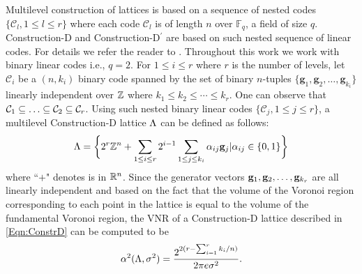 		Multilevel construction of lattices is based on a sequence of nested codes $\{\mathcal{C}_{l},1\leq l\leq r\}$ where each code $\mathcal{C}_{l}$ is of length $n$ over $\mathbb{F}_q$, a field of size $q$. Construction-D and Construction-D$^{\prime}$ are based on such nested sequence of linear codes. For details we refer the reader to \cite{conwaysphere}. Throughout this work we work with binary linear codes i.e., $q=2$. For $1\leq i \leq r$ where $r$ is the number of levels, let $\mathcal{C}_{i}$ be a $(n,k_i)$ binary code spanned by the set of binary $n$-tuples $\{\mathbf{g}_1,\mathbf{g}_2,\ldots,\mathbf{g}_{k_i}\}$ linearly independent over $\mathbb{Z}$ where $k_{1}\leq k_{2}\leq \cdots \leq k_{r}$. One can observe that $\mathcal{C}_{1}\subseteq \ldots \subseteq \mathcal{C}_{2}\subseteq \mathcal{C}_{r}$. Using such nested binary linear codes $\{\mathcal{C}_{j},1\leq j\leq r\}$, a multilevel Construction-D lattice $\Lambda$ can be defined as follows:
\begin{align}\label{Eqn:ConstrD}
 \Lambda=\biggl\{2^{r}\mathbb{Z}^{n}+\sum_{1\leq i\leq r}2^{i-1}\sum_{1\leq j\leq k_{i}}\alpha_{ij}\mathbf{g}_j|\alpha_{ij}\in\{0,1\}\biggr\}
\end{align}
where ``$+$" denotes is in $\mathbb{R}^{n}$.  Since the generator vectors $\mathbf{g}_{1},\mathbf{g}_{2},\ldots,\mathbf{g}_{k_{r}}$ are all linearly independent and based on the fact that the volume of the Voronoi region corresponding to each point in the lattice is equal to the 	volume of the fundamental Voronoi region, the VNR of a Construction-D lattice described in \eqref{Eqn:ConstrD} can be computed to be
\begin{equation}\label{Eqn:VNRConstrutionD}
    \alpha^{2}(\Lambda,\sigma^{2})=\frac{2^{2(r-\sum_{i=1}^{r}k_{i}/n)}}{2\pi e\sigma^{2}}.
\end{equation}

